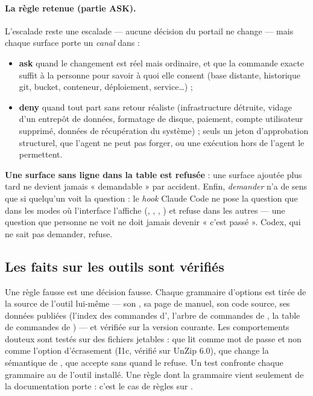 \paragraph{La règle retenue (partie ASK).} L'escalade reste une escalade --- aucune décision du
portail ne change --- mais chaque surface porte un \emph{canal} dans
 :
\begin{itemize}
  \item \textbf{ask} quand le changement est réel mais ordinaire, et que la commande exacte suffit
    à la personne pour savoir à quoi elle consent (base distante, historique git, bucket,
    conteneur, déploiement, service\ldots) ;
  \item \textbf{deny} quand tout part sans retour réaliste (infrastructure détruite, vidage d'un
    entrepôt de données, formatage de disque, paiement, compte utilisateur supprimé, données
    de récupération du système) ; seuls un jeton d'approbation structurel, que l'agent ne
    peut pas forger, ou une exécution hors de l'agent le permettent.
\end{itemize}
\textbf{Une surface sans ligne dans la table est refusée} : une surface ajoutée plus tard ne
devient jamais « demandable » par accident. Enfin, \emph{demander} n'a de sens que si
quelqu'un voit la question : le \textit{hook} Claude Code ne pose la question que dans les
modes où l'interface l'affiche (, , , ) et
refuse dans les autres --- une question que personne ne voit ne doit jamais devenir « c'est
passé ». Codex, qui ne sait pas demander, refuse.

\subsection{Les faits sur les outils sont vérifiés}
\label{sec:faits-verifies}

Une règle fausse est une décision fausse. Chaque grammaire d'options est tirée de la source
de l'outil lui-même --- son , sa page de manuel, son code source, ses données
publiées (l'index des commandes d', l'arbre de commandes de , la table
de commandes de ) --- et vérifiée sur la version courante. Les comportements
douteux sont testés sur des fichiers jetables : que  lit  comme mot de
passe et non comme l'option d'écrasement (I1c, vérifié sur UnZip 6.0), que 
change la sémantique de , que  accepte 
sans \cmd{=} quand  le refuse. Un test confronte chaque grammaire au
 de l'outil installé. Une règle dont la grammaire vient seulement de la
documentation porte  : c'est le cas de \nbnonverifiees{} règles sur
\nbregles{}.
